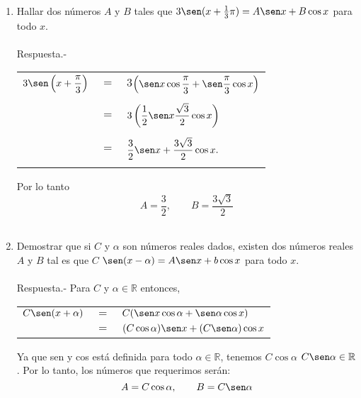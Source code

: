 \begin{enumerate}[\bfseries 1.]
\item Hallar dos números $A$ y $B$ tales que $3\sen (x+\frac{1}{3}\pi)=A\sen x + B\cos x$ para todo $x$.\\\\
    Respuesta.-\; 
    \begin{center}
	\begin{tabular}{rcl}
	    $3\sen\left(x+\dfrac{\pi}{3}\right)$&$=$&3$\left(\sen x \cos \dfrac{\pi}{3} + \sen \dfrac{\pi}{3} \cos x\right)$\\\\
	    &$=$&$3\left(\dfrac{1}{2}\sen x \dfrac{\sqrt{3}}{2} \cos x\right)$\\\\
	    &$=$&$\dfrac{3}{2} \sen x + \dfrac{3\sqrt{3}}{2}\cos x.$\\\\
	\end{tabular}
    \end{center}
    Por lo tanto $$A=\dfrac{3}{2}, \qquad B=\dfrac{3\sqrt{3}}{2}$$\\

\item Demostrar que si $C$ y $\alpha$ son números reales dados, existen dos números reales $A$ y $B$ tal es que $C$ $\sen(x-\alpha)=A \sen x + b \cos x $ para todo $x$.\\\\
    Respuesta.-\;  Para $C$ y $\alpha \in \mathbb{R}$ entonces, 
    \begin{center}
	\begin{tabular}{rcl}
	    $C\sen(x+\alpha)$&$=$&$C(\sen x \cos \alpha + \sen \alpha \cos x)$\\
			     &$=$&$(C \cos \alpha)\sen x + (C \sen \alpha)\cos x$\\
	\end{tabular}
    \end{center}
    Ya que sen y cos está definida para todo $\alpha \in \mathbb{R}$, tenemos $C \cos \alpha$ $C\sen \alpha \in \mathbb{R}$. Por lo tanto, los números que requerimos serán: 
    $$A = C \cos \alpha, \qquad B=C\sen \alpha$$\\


\end{enumerate}
